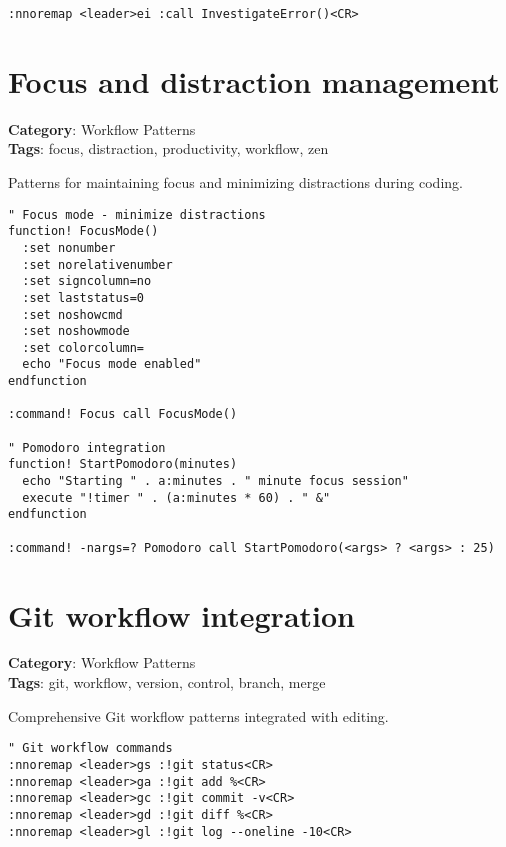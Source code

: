 {{{{{{{{{{{{{{{{{{\begin{Exa*}{}
\begin{Verbatim}[fontsize=\footnotesize, breaklines, breakanywhere]
:nnoremap <leader>ei :call InvestigateError()<CR>
\end{Verbatim}
\end{Exa*}

\section{Focus and distraction management}

\textbf{Category}: Workflow Patterns\\ \textbf{Tags}: focus, distraction, productivity, workflow, zen
\vspace{0.5cm}

Patterns for maintaining focus and minimizing distractions during coding.

\begin{Exa*}{}
\begin{Verbatim}[fontsize=\footnotesize, breaklines, breakanywhere]
" Focus mode - minimize distractions
function! FocusMode()
  :set nonumber
  :set norelativenumber
  :set signcolumn=no
  :set laststatus=0
  :set noshowcmd
  :set noshowmode
  :set colorcolumn=
  echo "Focus mode enabled"
endfunction

:command! Focus call FocusMode()

" Pomodoro integration
function! StartPomodoro(minutes)
  echo "Starting " . a:minutes . " minute focus session"
  execute "!timer " . (a:minutes * 60) . " &"
endfunction

:command! -nargs=? Pomodoro call StartPomodoro(<args> ? <args> : 25)
\end{Verbatim}
\end{Exa*}

\section{Git workflow integration}

\textbf{Category}: Workflow Patterns\\ \textbf{Tags}: git, workflow, version, control, branch, merge
\vspace{0.5cm}

Comprehensive Git workflow patterns integrated with editing.

\begin{Exa*}{}
\begin{Verbatim}[fontsize=\footnotesize, breaklines, breakanywhere]
" Git workflow commands
:nnoremap <leader>gs :!git status<CR>
:nnoremap <leader>ga :!git add %<CR>
:nnoremap <leader>gc :!git commit -v<CR>
:nnoremap <leader>gd :!git diff %<CR>
:nnoremap <leader>gl :!git log --oneline -10<CR>


\end{Verbatim}
\end{Exa*}}}}}}}}}}}}}}}}}}}
